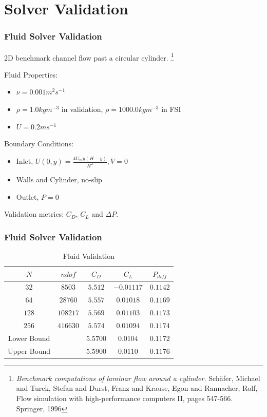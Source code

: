 \documentclass{beamer}
\begin{document}
\section{Solver Validation}
\begin{frame}
\frametitle{Fluid Solver Validation}
2D benchmark channel flow past a circular cylinder. \footnote{\tiny \textit{Benchmark computations of laminar flow around a cylinder.}  Sch{\"a}fer, Michael and Turek, Stefan and Durst, Franz and Krause, Egon and Rannacher, Rolf, Flow simulation with high-performance computers II, pages 547-566. Springer, 1996}

Fluid Properties: 
\begin{itemize}
\item $\nu = 0.001 m^2 s^{-1}$
\item $\rho = 1.0 kgm^{-3}$ in validation, $\rho = 1000.0 kgm^{-3}$ in FSI
\item $\bar{U} = 0.2 ms^{-1}$ %
\end{itemize}

Boundary Conditions:
\begin{itemize}
\item Inlet, $U(0, y) = \frac{4 U_m y (H - y)}{H^2} , V = 0$
\item Walls and Cylinder, no-slip
\item Outlet, $ P = 0$ 
\end{itemize}
Validation metrics:  $C_D$, $C_L$ and $\Delta P$. %

\end{frame}


\begin{frame} 
\frametitle{Fluid Solver Validation}

\FloatBarrier
\begin{table}[htbp]
\centering
\caption{Fluid Validation}
\begin{tabular}{ccccc}
\toprule
$N$ & $ndof$ & $C_D$ & $C_L$ & $P_{diff}$ \\
\midrule
$32$ & $8503$ & $5.512$ & $-0.01117$ & $0.1142$ \\
$64$ & $28760$ & $5.557$ & $0.01018$ & $0.1169$ \\
$128$ & $108217$ & $5.569$ & $0.01103$ & $0.1173$ \\
$256$ & $416630$ & $5.574$ & $0.01094$ & $0.1174$ \\
\midrule
Lower Bound & & $5.5700 $ & $ 0.0104 $ & $ 0.1172 $ \\
Upper Bound & & $5.5900 $ & $ 0.0110$ & $ 0.1176$ \\
\bottomrule
\end{tabular}%
\label{tab:fluidvalidation}%
\end{table}%
\FloatBarrier

\end{frame}
\end{document}
